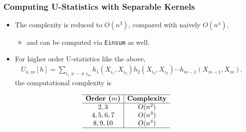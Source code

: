 \documentclass[9pt]{beamer}
\theoremstyle{mystyle}
\theoremstyle{mystyletwo}
\begin{document}
\begin{frame}
\frametitle{Computing U-Statistics with Separable Kernels}
\begin{itemize}
    \item The complexity is reduced to $O(n^3)$, compared with naively $O(n^4)$, 
    \begin{itemize}
        \item and can be computed via \texttt{Einsum} as well.
    \end{itemize}
    \item For higher order U-statistics like the above,  
    \begin{align*}
        U_{n,m}[h] = \sum_{i_1 \neq \cdots \neq i_m} h_1(X_{i_1}, X_{i_2}) h_2(X_{i_2},X_{i_3}) \cdots h_{m-1}(X_{m-1}, X_m), 
    \end{align*}
    the computational complexity is
\end{itemize}
\vspace{1.5em}
\begin{equation*}
\begin{array}{c|c}
\hline
\textbf{Order ($m$)} & \textbf{Complexity} \\
\hline
2, 3 & O(n^2) \\
4, 5, 6, 7 & O(n^3) \\
 8, 9, 10 & O(n^4) \\
\hline
\end{array}
\end{equation*}
\end{frame}
\end{document}
